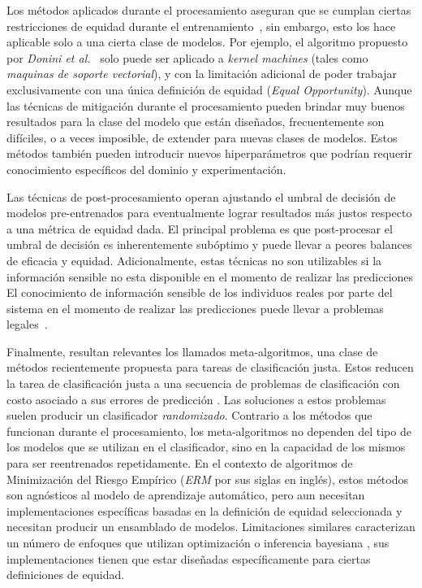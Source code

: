 Los métodos aplicados durante el procesamiento aseguran que se cumplan ciertas restricciones de equidad durante el entrenamiento~\parencite{donini2018empirical, zafar2017fairness, zafar2019fairness}, sin embargo, esto los hace aplicable solo a una cierta clase de modelos.
Por ejemplo, el algoritmo propuesto por \emph{Donini et al.}~\parencite{donini2018empirical} solo puede ser aplicado a \emph{kernel machines} (tales como \emph{maquinas de soporte vectorial}), y con la limitación adicional de poder trabajar exclusivamente con una única definición de equidad (\emph{Equal Opportunity}).
Aunque las técnicas de mitigación durante el procesamiento pueden brindar muy buenos resultados para la clase del modelo que están diseñados, frecuentemente son difíciles, o a veces imposible, de extender para nuevas clases de modelos.
Estos métodos también pueden introducir nuevos hiperparámetros que podrían requerir conocimiento específicos del dominio y experimentación.

Las técnicas de post-procesamiento operan ajustando el umbral de decisión de modelos pre-entrenados para eventualmente lograr resultados más justos respecto a una métrica de equidad dada.
El principal problema es que post-procesar el umbral de decisión es inherentemente subóptimo y puede llevar a peores balances de eficacia y equidad.
Adicionalmente, estas técnicas no son utilizables si la información sensible no esta disponible en el momento de realizar las predicciones
El conocimiento de información sensible de los individuos reales por parte del sistema en el momento de realizar las predicciones puede llevar a problemas legales~\parencite{MacCarthy2018StandardsOF}.

Finalmente, resultan relevantes los llamados meta-algoritmos, una clase de métodos recientemente propuesta para tareas de clasificación justa.
Estos reducen la tarea de clasificación justa a una secuencia de problemas de clasificación con costo asociado a sus errores de predicción \parencite{agarwal2018reductions, agarwal2019fair, kearns2018preventing}.
Las soluciones a estos problemas suelen producir un clasificador \emph{randomizado}. Contrario a los métodos que funcionan durante el procesamiento, los meta-algoritmos no dependen del tipo de los modelos que se utilizan en el clasificador, sino en la capacidad de los mismos para ser reentrenados repetidamente.
En el contexto de algoritmos de Minimización del Riesgo Empírico (\emph{ERM} por sus siglas en inglés), estos métodos son agnósticos al modelo de aprendizaje automático, pero aun necesitan implementaciones específicas basadas en la definición de equidad seleccionada y necesitan producir un ensamblado de modelos. Limitaciones similares caracterizan un número de enfoques que utilizan optimización \parencite{chiappa2018causal,Dimitrakakis_Liu_Parkes_Radanovic_2019} o inferencia bayesiana \parencite{kearns2018preventing,thomas2019preventing}, sus implementaciones tienen que estar diseñadas específicamente para ciertas definiciones de equidad.

